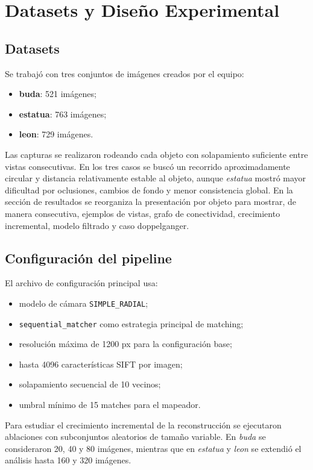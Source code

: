 \documentclass[conference]{IEEEtran}
\begin{document}
\section{Datasets y Dise\~no Experimental}\label{sec:exp}

\subsection{Datasets}

Se trabaj\'o con tres conjuntos de im\'agenes creados por el equipo:
\begin{itemize}
  \item \textbf{buda}: 521 im\'agenes;
  \item \textbf{estatua}: 763 im\'agenes;
  \item \textbf{leon}: 729 im\'agenes.
\end{itemize}

Las capturas se realizaron rodeando cada objeto con solapamiento suficiente entre vistas consecutivas. En los tres casos se busc\'o un recorrido aproximadamente circular y distancia relativamente estable al objeto, aunque \emph{estatua} mostr\'o mayor dificultad por oclusiones, cambios de fondo y menor consistencia global. En la secci\'on de resultados se reorganiza la presentaci\'on por objeto para mostrar, de manera consecutiva, ejemplos de vistas, grafo de conectividad, crecimiento incremental, modelo filtrado y caso doppelganger.

\subsection{Configuraci\'on del pipeline}

El archivo de configuraci\'on principal usa:
\begin{itemize}
  \item modelo de c\'amara \texttt{SIMPLE\_RADIAL};
  \item \texttt{sequential\_matcher} como estrategia principal de matching;
  \item resoluci\'on m\'axima de 1200 px para la configuraci\'on base;
  \item hasta 4096 caracter\'isticas SIFT por imagen;
  \item solapamiento secuencial de 10 vecinos;
  \item umbral m\'inimo de 15 matches para el mapeador.
\end{itemize}

Para estudiar el crecimiento incremental de la reconstrucci\'on se ejecutaron ablaciones con subconjuntos aleatorios de tama\~no variable. En \emph{buda} se consideraron 20, 40 y 80 im\'agenes, mientras que en \emph{estatua} y \emph{leon} se extendi\'o el an\'alisis hasta 160 y 320 im\'agenes.
\end{document}
